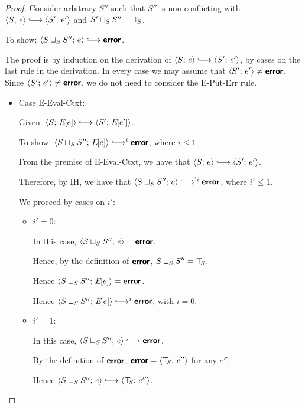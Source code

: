 \begin{proof}
  Consider arbitrary $S''$ such that $S''$ is non-conflicting with
  $\config{S}{e} \parstepsto \config{S'}{e'}$ and $S' \sqcup_{S} S''
  = \top\hspace{-0.85mm}_{S}$.

  To show: $\config{\lubstore{S}{S''}}{e} \parstepsto \error$.

  The proof is by induction on the derivation of $\config{S}{e}
  \parstepsto \config{S'}{e'}$, by cases on the last rule in the
  derivation.  In every case we may assume that $\langle S';\, e' \rangle \neq
  \textbf{\textsf{error}}$.  Since $\langle S';\, e' \rangle \neq \textbf{\textsf{error}}$, we do not need to
  consider the {\sc E-Put-Err} rule.

  \begin{itemize}

    \item Case {\sc E-Eval-Ctxt}:

      Given: $\config{S}{\E{e}} \parstepsto \config{S'}{\E{e'}}$.

      To show: $\config{\lubstore{S}{S''}}{\E{e}} \parstepsto^i
      \error$, where $i \leq 1$.

      From the premise of {\sc E-Eval-Ctxt}, we have that
      $\config{S}{e} \parstepsto \config{S'}{e'}$.

      Therefore, by IH, we have that $\config{\lubstore{S}{S''}}{e}
      \parstepsto^{'i} \error$, where $i' \leq 1$.

      We proceed by cases on $i'$:

      \begin{itemize}
        \item $i' = 0$:

          In this case, $\langle S \sqcup_{S} S'';\, e \rangle = \textbf{\textsf{error}}$.

          Hence, by the definition of $\textbf{\textsf{error}}$, $S \sqcup_{S} S'' =
          \top\hspace{-0.85mm}_{S}$.

          Hence $\langle S \sqcup_{S} S'';\, E\hspace{-1mm}\left[e\right] \rangle = \textbf{\textsf{error}}$.

          Hence $\config{\lubstore{S}{S''}}{\E{e}} \parstepsto^i
          \error$, with $i = 0$.

        \item $i' = 1$:

          In this case, $\config{\lubstore{S}{S''}}{e} \parstepsto
          \error$.

          By the definition of $\textbf{\textsf{error}}$, $\textbf{\textsf{error}} =
          \langle \top\hspace{-0.85mm}_{S};\, e'' \rangle$ for any $e''$.

          Hence $\config{\lubstore{S}{S''}}{e} \parstepsto
          \config{\topS}{e''}$.


\end{itemize}
\end{itemize}
\end{proof}
